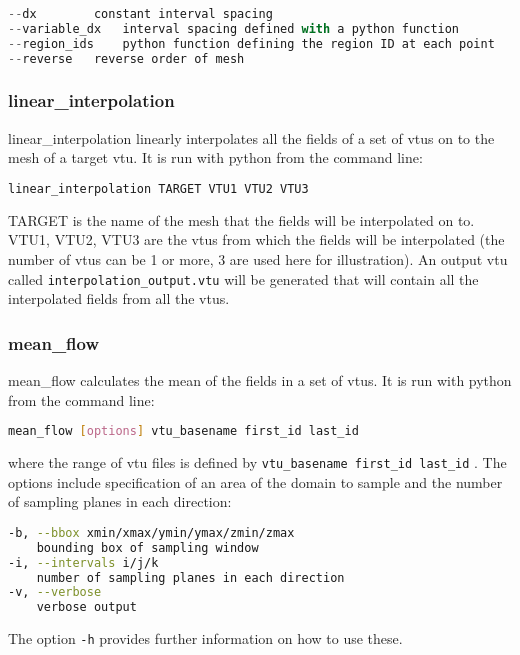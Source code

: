 \begin{lstlisting}[language = Python]
--dx		constant interval spacing
--variable_dx	interval spacing defined with a python function
--region_ids	python function defining the region ID at each point
--reverse	reverse order of mesh
\end{lstlisting}


\subsubsection{linear\_interpolation}
\label{sec:scripts_linear_interpolation}
linear\_interpolation linearly interpolates all the fields of a set of vtus on to the mesh of a target vtu. It is run with python from the command line:
\begin{lstlisting}[language = Bash]
linear_interpolation TARGET VTU1 VTU2 VTU3 
\end{lstlisting}
TARGET is the name of the mesh that the fields will be interpolated on to. VTU1, VTU2, VTU3 are the vtus from which the fields will be interpolated (the number of vtus can be 1 or more, 3 are used here for illustration). An output vtu called \lstinline[language = Bash]+interpolation_output.vtu+ will be generated that will contain all the interpolated fields from all the vtus. 

 
\subsubsection{mean\_flow}
\label{sec:mean_flow}

mean\_flow calculates the mean of the fields in a set of vtus. It is run with python from the command line:
\begin{lstlisting}[language = Bash]
mean_flow [options] vtu_basename first_id last_id
\end{lstlisting}
where the range of vtu files is defined by \lstinline[language = python]+vtu_basename first_id last_id+ . 
The options include specification of an area of the domain to sample and the number of sampling planes in each direction:
\begin{lstlisting}[language = Bash]
-b, --bbox xmin/xmax/ymin/ymax/zmin/zmax
	bounding box of sampling window
-i, --intervals i/j/k
	number of sampling planes in each direction
-v, --verbose
   	verbose output
\end{lstlisting}
The option \lstinline[language = Bash]+-h+ provides further information on how to use these.

